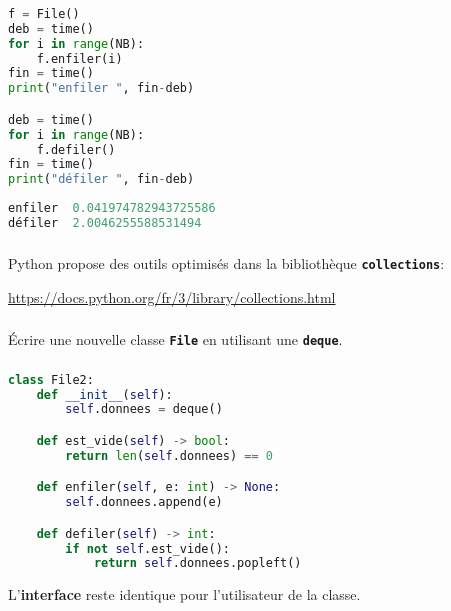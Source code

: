 \documentclass[svgnames,11pt]{beamer}
\begin{document}
\begin{frame}[fragile]
    \frametitle{}

\begin{lstlisting}[language=Python , basicstyle=\ttfamily\small, xleftmargin=2em, xrightmargin=2em]
f = File()
deb = time()
for i in range(NB):
    f.enfiler(i)
fin = time()
print("enfiler ", fin-deb)

deb = time()
for i in range(NB):
    f.defiler()
fin = time()
print("défiler ", fin-deb)    
\end{lstlisting}
\begin{lstlisting}[language=Python , basicstyle=\ttfamily\small, xleftmargin=2em, xrightmargin=2em]
enfiler  0.041974782943725586
défiler  2.0046255588531494   
\end{lstlisting}
\end{frame}
\begin{frame}
    \frametitle{}

    \begin{aretenir}[]
Python propose des outils optimisés dans la bibliothèque \textbf{\texttt{collections}}: 
\begin{center}
    \url{https://docs.python.org/fr/3/library/collections.html}
\end{center}
    \end{aretenir}

\end{frame}
\begin{frame}
    \frametitle{}

    Écrire une nouvelle classe \textbf{\texttt{File}} en utilisant une \textbf{\texttt{deque}}.

\end{frame}
\begin{frame}[fragile]
    \frametitle{}

    \begin{lstlisting}[language=Python , basicstyle=\ttfamily\small, xleftmargin=2em, xrightmargin=2em]
class File2:
    def __init__(self):
        self.donnees = deque()

    def est_vide(self) -> bool:
        return len(self.donnees) == 0

    def enfiler(self, e: int) -> None:
        self.donnees.append(e)

    def defiler(self) -> int:
        if not self.est_vide():
            return self.donnees.popleft()    
\end{lstlisting}
\begin{aretenir}[Observation]
L'\textbf{interface} reste identique pour l'utilisateur de la classe.
\end{aretenir}
\end{frame}
\end{document}
